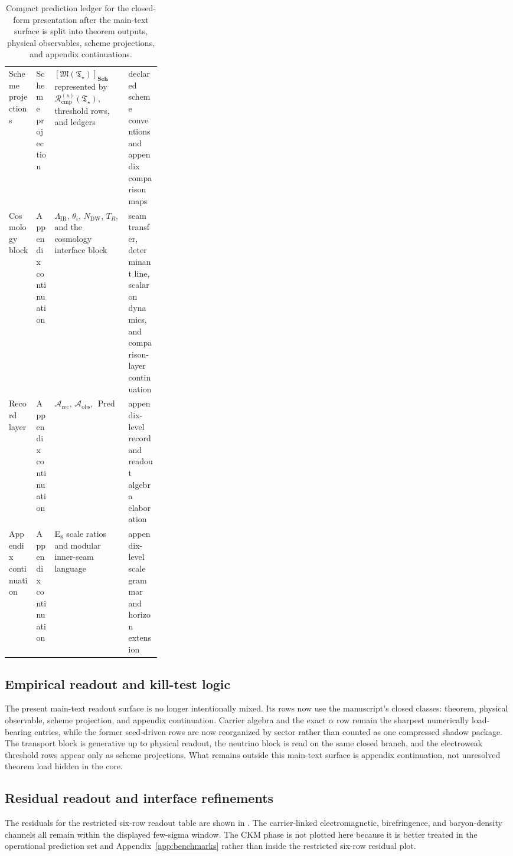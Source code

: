 \documentclass[11pt,a4paper]{article}
\theoremstyle{definition}
\theoremstyle{remark}
\newcommand{\Arec}{\mathcal A_{\mathrm{rec}}}
\newcommand{\Aobs}{\mathcal A_{\mathrm{obs}}}
\newcommand{\Pred}{\operatorname{Pred}}
\newcommand{\Tstar}{\mathfrak T_{\star}}
\newcommand{\Rcmp}{\mathcal R_{\mathrm{cmp}}}
\newcommand{\SchGrp}{\mathbf{Sch}}
\newcommand{\Mop}{\mathfrak M}
\begin{document}
\begin{table}[t]
\begin{tabularx}{\linewidth}{@{}>{\raggedright\arraybackslash}p{0.18\linewidth}>{\raggedright\arraybackslash}p{0.12\linewidth}YY@{}}
Scheme projections & Scheme projection & $[\Mop(\Tstar)]_{\SchGrp}$ represented by $\Rcmp^{(s)}(\Tstar)$, threshold rows, and ledgers & declared scheme conventions and appendix comparison maps \\
Cosmology block & Appendix continuation & $\Lambda_{\mathrm{IR}}$, $\theta_i$, $N_{\mathrm{DW}}$, $T_R$, and the cosmology interface block & seam transfer, determinant line, scalaron dynamics, and comparison-layer continuation \\
Record layer & Appendix continuation & $\Arec$, $\Aobs$, $\Pred$ & appendix-level record and readout algebra elaboration \\
Appendix continuation & Appendix continuation & E$_8$ scale ratios and modular inner-seam language & appendix-level scale grammar and horizon extension \\
\bottomrule
\end{tabularx}
\caption{Compact prediction ledger for the closed-form presentation after the main-text surface is
split into theorem outputs, physical observables, scheme projections, and appendix continuations.}
\label{tab:prediction-ledger}
\end{table}

\subsection{Empirical readout and kill-test logic}

The present main-text readout surface is no longer intentionally mixed. Its rows now use the
manuscript's closed classes: theorem, physical observable, scheme projection, and appendix
continuation. Carrier algebra and the exact $\alpha$ row remain the sharpest numerically
load-bearing entries, while the former seed-driven rows are now reorganized by sector rather than
counted as one compressed shadow package. The transport block is generative up to physical readout,
the neutrino block is read on the same closed branch, and the electroweak threshold rows appear
only as scheme projections. What remains outside this main-text surface is appendix continuation,
not unresolved theorem load hidden in the core.

\subsection{Residual readout and interface refinements}

The residuals for the restricted six-row readout table are shown in
. The carrier-linked electromagnetic, birefringence, and baryon-density
channels all remain within the displayed few-sigma window. The CKM phase is not plotted here
because it is better treated in the operational prediction set and Appendix~\ref{app:benchmarks}
rather than inside the restricted six-row residual plot.
\end{document}

